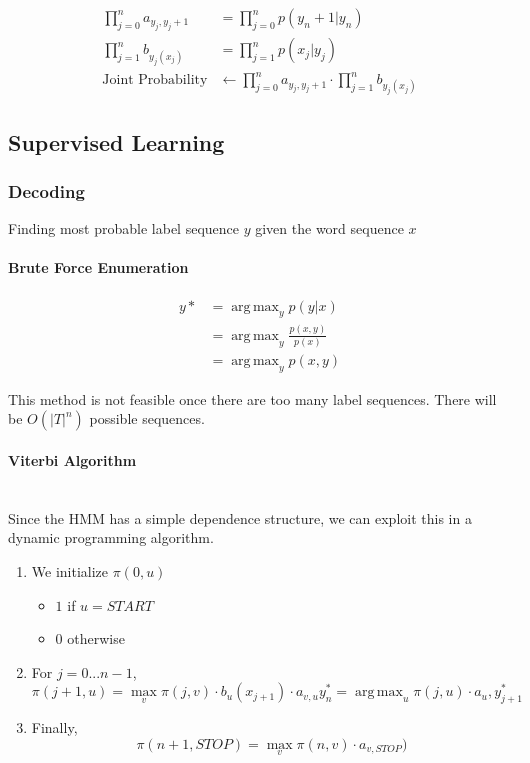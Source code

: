 \documentclass[a4paper]{article}
\DeclareMathOperator*{\argmax}{arg\,max}
\begin{document}
\begin{align*}
	\prod_{j=0}^n a_{y_j,y_j+1} &= \prod_{j=0}^n p(y_n+1 | y_n)\\
	\prod_{j=1}^n b_{y_j(x_j)} &= \prod_{j=1}^n p(x_j|y_j)\\
	\text{Joint Probability} &\leftarrow \prod_{j=0}^n a_{y_j,y_j+1} \cdot \prod_{j=1}^n b_{y_j(x_j)}
\end{align*}

\subsection{Supervised Learning}

\subsubsection{Decoding}

Finding most probable label sequence $y$ given the word sequence $x$


\paragraph{Brute Force Enumeration}
\begin{align*}
	y* &= \argmax_y p(y|x)\\
	&= \argmax_y \frac{p(x, y)}{p(x)}\\
	&= \argmax_y p(x,y)
\end{align*}

\noindent This method is not feasible once there are too many label sequences. There will be $O(|T|^n)$ possible sequences.

\paragraph{Viterbi Algorithm}\mbox{}\\
Since the HMM has a simple dependence structure, we can exploit this in a dynamic programming algorithm.

\begin{enumerate}
	\item We initialize $\pi(0,u)$
	\begin{itemize}[label=$\circ$]
		\item $1$ if $u = START$
		\item $0$ otherwise
	\end{itemize}
	\item For $j=0...n-1$, $$ \pi (j+1,u) = \max_v { \pi(j,v) \cdot b_u(x_{j+1}) \cdot a_{v,u} } y_n^* =\argmax_u { \pi(j,u) \cdot a_u,y^*_{j+1}} $$
	\item Finally, $$ \pi (n+1,STOP) = \max_v { \pi(n,v) \cdot a_{v,STOP}) } $$
\end{enumerate}
\end{document}
